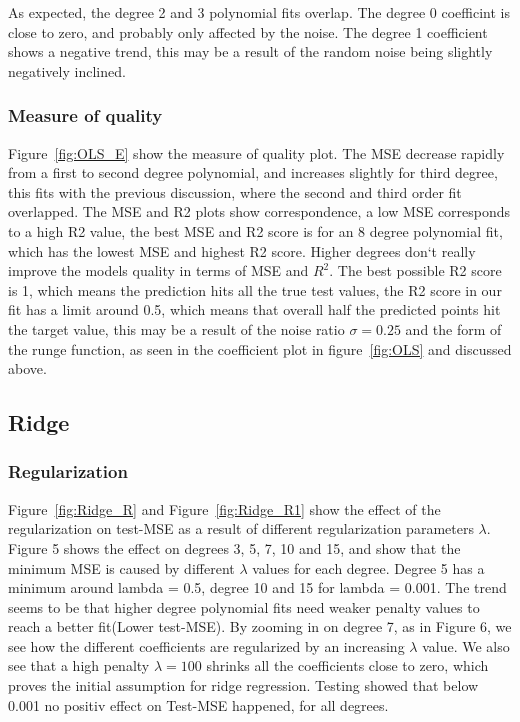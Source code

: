 \documentclass[aps,rmp,reprint,raggedbottom,amsmath,amssymb,longbibliography]{revtex4-1}
\begin{document}
As expected, the degree 2 and 3 polynomial fits overlap. 
The degree 0 coefficint is close to zero, and probably only affected by the noise.
The degree 1 coefficient shows a negative trend, this may be a result of the random noise being
slightly negatively inclined.

\subsubsection{Measure of quality}
Figure~\ref{fig:OLS_E} show the measure of quality plot.
The MSE decrease rapidly from a first to second degree polynomial, and
increases slightly for third degree, this fits with the previous discussion,
where the second and third order fit overlapped. The MSE and R2 plots
show correspondence, a low MSE corresponds to a high R2 value, 
the best MSE and R2 score is for an 8 degree polynomial fit, which 
has the lowest MSE and highest R2 score. Higher degrees don`t really
improve the models quality in terms of MSE and $R^2$. 
The best possible R2 score is 1, which means
the prediction hits all the true test values, the R2 score in our fit has a limit
around 0.5, which means that overall half the predicted points hit the 
target value, this may be a result of the noise ratio $\sigma=0.25$ and
the form of the runge function, as seen in the coefficient plot in 
figure~\ref{fig:OLS} and discussed above.

\subsection{Ridge}
\subsubsection{Regularization}
Figure~\ref{fig:Ridge_R} and Figure~\ref{fig:Ridge_R1} show the 
effect of the regularization on test-MSE as a result of different regularization 
parameters $\lambda$. Figure 5 shows the effect on degrees
3, 5, 7, 10 and 15, and show that the minimum MSE is caused by 
different $\lambda$ values for each degree. Degree 5 has a minimum
around lambda = 0.5, degree 10 and 15 for lambda = 0.001.
The trend seems to be that higher degree polynomial fits need
weaker penalty values to reach a better fit(Lower test-MSE). 
By zooming in on degree 7, as in Figure 6, we see how the different
coefficients are regularized by an increasing $\lambda$ value.
We also see that a high penalty $\lambda=100$ shrinks all the coefficients
close to zero, which proves the initial assumption for ridge regression.
Testing showed that below 0.001 no positiv effect on Test-MSE happened,
for all degrees.
\end{document}
